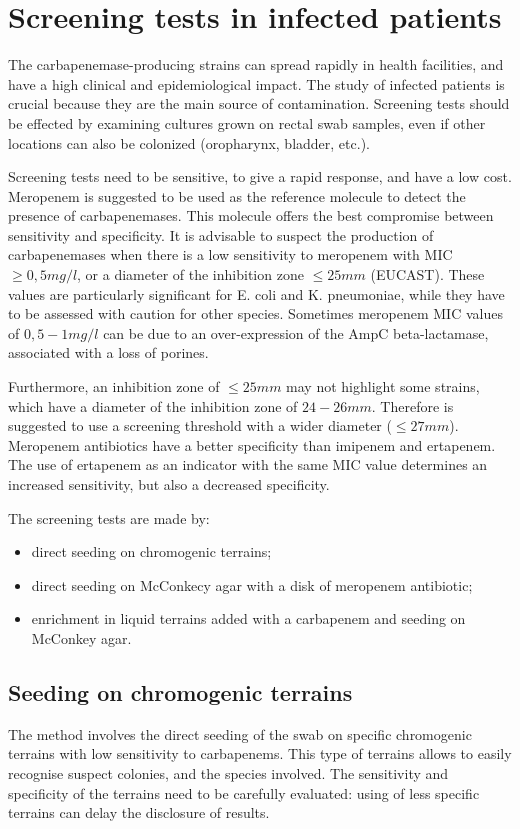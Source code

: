 \documentclass[11pt]{report}
\begin{document}
\section{Screening tests in infected patients}
The carbapenemase-producing strains can spread rapidly in health facilities, and have a high clinical and epidemiological impact.
The study of infected patients is crucial because they are the main source of contamination.
Screening tests should be effected by examining cultures grown on rectal swab samples, even if other locations can also be colonized (oropharynx, bladder, etc.).

Screening tests need to be sensitive, to give a rapid response, and have a low cost.
Meropenem is suggested to be used as the reference molecule to detect the presence of carbapenemases. This molecule offers the best compromise between sensitivity and specificity. 
It is advisable to suspect the production of carbapenemases when there is a low sensitivity to meropenem with MIC $\ge 0,5 mg/l$, or a diameter of the inhibition zone $\le 25 mm$ (EUCAST).
These values are particularly significant for E. coli and K. pneumoniae, while they have to be assessed with caution for other species. Sometimes meropenem MIC values of $0,5-1 mg/l$ can be due to an over-expression of the AmpC beta-lactamase, associated with a loss of porines.

Furthermore, an inhibition zone of $\le 25 mm$ may not highlight some strains, which have a diameter of the inhibition zone of $24-26 mm$. Therefore is suggested to use a screening threshold with a wider diameter ($\le 27 mm$).
Meropenem antibiotics have a better specificity than imipenem and ertapenem.
The use of ertapenem as an indicator with the same MIC value determines an increased sensitivity, but also a decreased specificity.


The screening tests are made by:
\begin{itemize}
\item direct seeding on chromogenic terrains;
\item direct seeding on McConkecy agar with a disk of meropenem antibiotic;
\item enrichment in liquid terrains added with a carbapenem and seeding on McConkey agar.
\end{itemize}

\subsection{Seeding on chromogenic terrains}
The method involves the direct seeding of the swab on specific chromogenic terrains with low sensitivity to carbapenems.
This type of terrains allows to easily recognise suspect colonies, and the species involved.
The sensitivity and specificity of the terrains need to be carefully evaluated:  using of less specific terrains can delay the disclosure of results.
\end{document}
